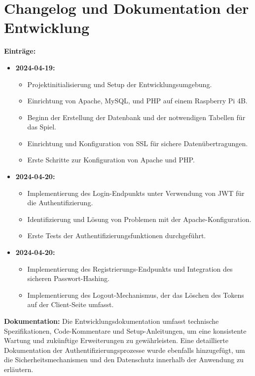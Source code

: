 \documentclass{article}
\begin{document}
\section{Changelog und Dokumentation der Entwicklung}
\textbf{Einträge:}
\begin{itemize}
    \item \textbf{2024-04-19:} 
        \begin{itemize}
            \item Projektinitialisierung und Setup der Entwicklungsumgebung.
            \item Einrichtung von Apache, MySQL, und PHP auf einem Raspberry Pi 4B.
            \item Beginn der Erstellung der Datenbank und der notwendigen Tabellen für das Spiel.
            \item Einrichtung und Konfiguration von SSL für sichere Datenübertragungen.
            \item Erste Schritte zur Konfiguration von Apache und PHP.
        \end{itemize}
    \item \textbf{2024-04-20:}
        \begin{itemize}
            \item Implementierung des Login-Endpunkts unter Verwendung von JWT für die Authentifizierung.
            \item Identifizierung und Lösung von Problemen mit der Apache-Konfiguration.
            \item Erste Tests der Authentifizierungsfunktionen durchgeführt.
        \end{itemize}
    \item \textbf{2024-04-20:} 
        \begin{itemize}
            \item Implementierung des Registrierungs-Endpunkts und Integration des sicheren Passwort-Hashing.
            \item Implementierung des Logout-Mechanismus, der das Löschen des Tokens auf der Client-Seite umfasst.
        \end{itemize}
\end{itemize}

\vspace{1em}
\textbf{Dokumentation:} \newline
Die Entwicklungsdokumentation umfasst technische Spezifikationen, Code-Kommentare und Setup-Anleitungen, um eine konsistente Wartung und zukünftige Erweiterungen zu gewährleisten. Eine detaillierte Dokumentation der Authentifizierungsprozesse wurde ebenfalls hinzugefügt, um die Sicherheitsmechanismen und den Datenschutz innerhalb der Anwendung zu erläutern.



	
\end{document}
